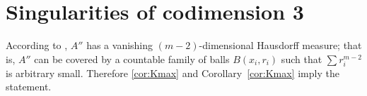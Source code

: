 \section{Singularities of codimension 3}\label{sec:codmi=3}


According to \cite[10.6]{BGP}, $A''$ has a vanishing $(m-2)$-dimensional Hausdorff measure;
that is, $A''$ can be covered by a countable family of balls $B(x_i,r_i)$ such that $\sum r_i^{m-2}$ is arbitrary small.
Therefore \ref{cor:Kmax} and Corollary~\ref{cor:Kmax} imply the statement.
\qeds
